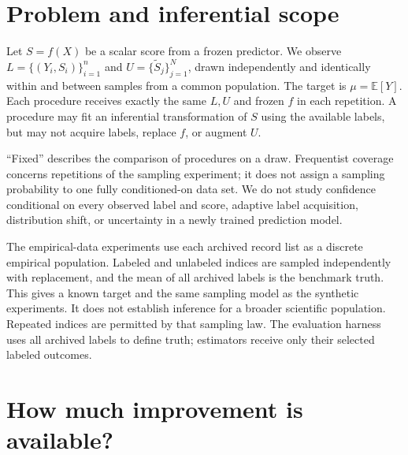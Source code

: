 

\section{Problem and inferential scope}\label{sec:problem}
Let $S=f(X)$ be a scalar score from a frozen predictor. We observe $L=\{(Y_i,S_i)\}_{i=1}^n$ and $U=\{\widetilde S_j\}_{j=1}^N$, drawn independently and identically within and between samples from a common population. The target is $\mu=\mathbb E[Y]$. Each procedure receives exactly the same $L,U$ and frozen $f$ in each repetition. A procedure may fit an inferential transformation of $S$ using the available labels, but may not acquire labels, replace $f$, or augment $U$.

``Fixed'' describes the comparison of procedures on a draw. Frequentist coverage concerns repetitions of the sampling experiment; it does not assign a sampling probability to one fully conditioned-on data set. We do not study confidence conditional on every observed label and score, adaptive label acquisition, distribution shift, or uncertainty in a newly trained prediction model.

The empirical-data experiments use each archived record list as a discrete empirical population. Labeled and unlabeled indices are sampled independently with replacement, and the mean of all archived labels is the benchmark truth. This gives a known target and the same sampling model as the synthetic experiments. It does not establish inference for a broader scientific population. Repeated indices are permitted by that sampling law. The evaluation harness uses all archived labels to define truth; estimators receive only their selected labeled outcomes.

\section{How much improvement is available?}\label{sec:method}
